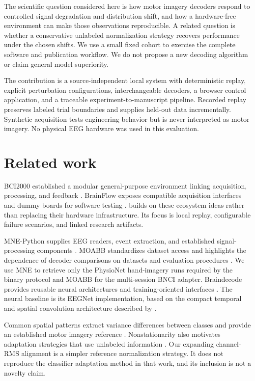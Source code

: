 \documentclass[11pt]{article}
\begin{document}
The scientific question considered here is how motor imagery decoders respond to controlled signal degradation and distribution shift, and how a hardware-free environment can make those observations reproducible. A related question is whether a conservative unlabeled normalization strategy recovers performance under the chosen shifts. We use a small fixed cohort to exercise the complete software and publication workflow. We do not propose a new decoding algorithm or claim general model superiority.

The contribution is a source-independent local system with deterministic replay, explicit perturbation configurations, interchangeable decoders, a browser control application, and a traceable experiment-to-manuscript pipeline. Recorded replay preserves labeled trial boundaries and supplies held-out data incrementally. Synthetic acquisition tests engineering behavior but is never interpreted as motor imagery. No physical EEG hardware was used in this evaluation.

\section{Related work}
BCI2000 established a modular general-purpose environment linking acquisition, processing, and feedback \citep{schalk2004}. BrainFlow exposes compatible acquisition interfaces and dummy boards for software testing \citep{brainflow}. \project{} builds on these ecosystem ideas rather than replacing their hardware infrastructure. Its focus is local replay, configurable failure scenarios, and linked research artifacts.

MNE-Python supplies EEG readers, event extraction, and established signal-processing components \citep{mne}. MOABB standardizes dataset access and highlights the dependence of decoder comparisons on datasets and evaluation procedures \citep{moabb}. We use MNE to retrieve only the PhysioNet hand-imagery runs required by the binary protocol and MOABB for the multi-session BNCI adapter. Braindecode provides reusable neural architectures and training-oriented interfaces \citep{braindecode}. The neural baseline is its EEGNet implementation, based on the compact temporal and spatial convolution architecture described by \citet{eegnet}.

Common spatial patterns extract variance differences between classes and provide an established motor imagery reference \citep{csp}. Nonstationarity also motivates adaptation strategies that use unlabeled information \citep{adaptation}. Our expanding channel-RMS alignment is a simpler reference normalization strategy. It does not reproduce the classifier adaptation method in that work, and its inclusion is not a novelty claim.
\end{document}

